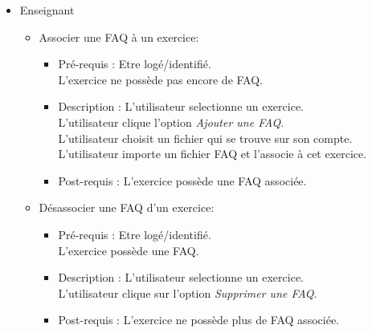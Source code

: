 	\begin{itemize}
	\item Enseignant
		\begin{itemize}
		\item Associer une FAQ {\`a} un exercice:
			\begin{itemize}
			\item Pr{\'e}-requis : Etre log{\'e}/identifi{\'e}.\\
			L'exercice ne poss{\`e}de pas encore de FAQ.
			\item Description :  L'utilisateur selectionne un exercice.\\
			L'utilisateur clique l'option {\it Ajouter une FAQ}.\\
			L'utilisateur choisit un fichier qui se trouve sur son compte.
			L'utilisateur importe un fichier FAQ et l'associe {\`a} cet exercice.
			\item Post-requis : L'exercice poss{\`e}de une FAQ associ{\'e}e.
			\end{itemize}

		\item D{\'e}sassocier une FAQ d'un exercice:
			\begin{itemize}
			\item Pr{\'e}-requis : Etre log{\'e}/identifi{\'e}.\\
			L'exercice poss{\`e}de une FAQ.
			\item Description :  L'utilisateur selectionne un exercice.\\
			L'utilisateur clique sur l'option {\it Supprimer une FAQ}.
			\item Post-requis : L'exercice ne poss{\`e}de plus de FAQ associ{\'e}e.\\
			\end{itemize}
		\end{itemize}
	\end{itemize}

